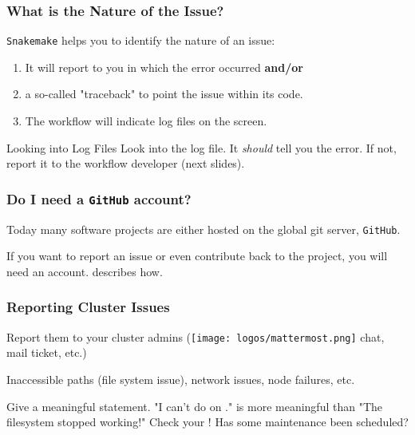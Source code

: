 \begin{frame}
  \frametitle{What is the Nature of the Issue?}
  \texttt{Snakemake} helps you to identify the nature of an issue:
  \begin{enumerate}[<+->]
  	\item It will report to you in which  the error occurred \textbf{and/or}
  	\item a so-called "traceback" to point the issue within its code.
  	\item The workflow will indicate log files on the screen.
  \end{enumerate}
  \pause
  \begin{docs}{Looking into Log Files}
  	Look into the log file. It \textit{should} tell you the error. \pause If not, report it to the workflow developer (next slides). 
  \end{docs}
\end{frame}

\begin{frame}
  \frametitle{Do I need a \texttt{GitHub} account?}
  Today many software projects are either hosted on the global git server, \texttt{GitHub}.
  \begin{docs}
  	If you want to report an issue or even contribute back to the project, you will need an account.  describes how. 
  \end{docs}
  
\end{frame}

\begin{frame}
	\frametitle{Reporting Cluster Issues}
	\begin{question}[Where?]
	  Report them to your cluster admins (\texttt{[image: logos/mattermost.png]} chat, \Email{} mail ticket, etc.)
	\end{question}
    \pause
    \begin{question}[What?]
      Inaccessible paths (file system issue), network issues, node failures, etc. 
    \end{question}
    \pause
    \begin{question}[How?]
      Give a meaningful statement. "I can't do  on ." is more meaningful than "The filesystem stopped working!"\newline
      \bcattention Check your \Email{}! Has some maintenance been scheduled?
    \end{question}	
\end{frame}

